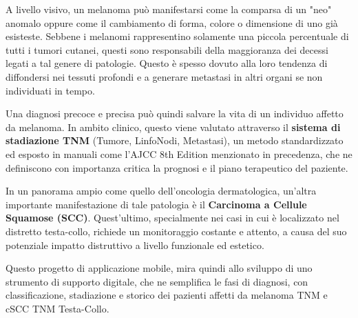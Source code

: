 A livello visivo, un melanoma può manifestarsi come la comparsa di un "neo" anomalo oppure come il cambiamento di forma, colore o dimensione di uno
già esisteste.
Sebbene i melanomi rappresentino solamente una piccola percentuale di tutti i tumori cutanei, questi sono responsabili della
maggioranza dei decessi legati a tal genere di patologie.
Questo è spesso dovuto alla loro tendenza di diffondersi nei tessuti profondi e a generare metastasi in altri organi se non individuati
in tempo.

Una diagnosi precoce e precisa può quindi salvare la vita di un individuo affetto da melanoma.
In ambito clinico, questo viene valutato attraverso il \textbf{sistema di stadiazione TNM} (Tumore, LinfoNodi, Metastasi), un metodo standardizzato
ed esposto in manuali come l'AJCC 8th Edition menzionato in precedenza, che ne definiscono con importanza critica la prognosi e il piano
terapeutico del paziente.

In un panorama ampio come quello dell'oncologia dermatologica, un'altra importante manifestazione di tale patologia è il
\textbf{Carcinoma a Cellule Squamose (SCC)}.
Quest'ultimo, specialmente nei casi in cui è localizzato nel distretto testa-collo, richiede un monitoraggio costante e attento,
a causa del suo potenziale impatto distruttivo a livello funzionale ed estetico.

Questo progetto di applicazione mobile, mira quindi allo sviluppo di uno strumento di supporto digitale, che ne semplifica le fasi
di diagnosi, con classificazione, stadiazione e storico dei pazienti affetti da melanoma TNM e cSCC TNM Testa-Collo.
